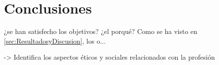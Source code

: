 
\chapter{Conclusiones}
\label{cha:Conclusiones}

    ¿se han satisfecho los objetivos? ¿el porqué? Como se ha visto en \ref{sec:ResultadosyDiscusion}, los o...

    -> Identifica los aspectos éticos y sociales relacionados con la profesión

